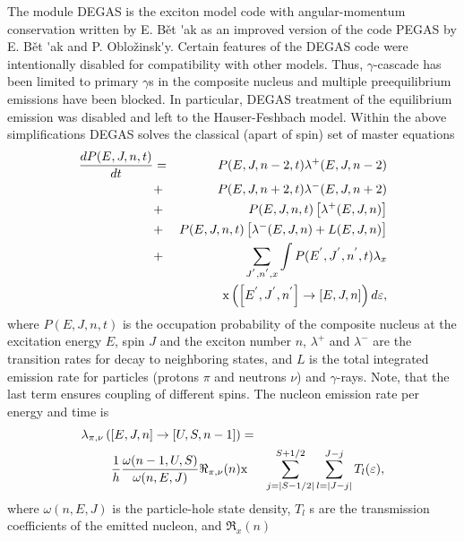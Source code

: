 The module DEGAS%
 is the exciton model code with angular-momentum conservation
written by E. B\v{e}t%
\'{ }ak as an improved version of the code PEGAS \cite{Degas} by E. B\v{e}t%
\'{ }ak and P. Oblo\v{z}insk\'{ }y. Certain features of the DEGAS code were
intentionally disabled for compatibility with other models.
Thus, $\gamma $-cascade has been limited to primary $\gamma $s in the
composite nucleus and multiple preequilibrium emissions have been blocked.
In particular, DEGAS treatment of the equilibrium emission was disabled and
left to the Hauser-Feshbach%
 model. %
Within the above simplifications DEGAS%
 solves the classical (apart of spin) set of master equations
\begin{eqnarray}
\frac{dP(E,J,n,t)}{dt} &=&P(E,J,n-2,t)\lambda ^{+}(E,J,n-2)  \notag \\
&+&P(E,J,n+2,t)\lambda ^{-}(E,J,n+2)  \notag \\
&+&P(E,J,n,t)\left[ \lambda ^{+}(E,J,n)\right]  \notag \\
&+&P(E,J,n,t)\left[ \lambda ^{-}(E,J,n)+L(E,J,n)\right]  \notag
\label{mastereq} \\
&+&\sum_{J^{^{\prime }},n^{^{\prime }},x}\int P(E^{^{\prime }},J^{^{\prime
}},n^{^{\prime }},t)\lambda _{x}  \notag \\
&&\text{x}\left( \left[ E^{^{\prime }},J^{^{\prime }},n^{^{\prime }}\right]
\rightarrow \left[ E,J,n\right] \right) d\varepsilon ,
\end{eqnarray}%
\noindent where $P(E,J,n,t)$ is the occupation probability of the composite
nucleus at the excitation energy $E$, spin $J$ and the exciton number $n$, $%
\lambda ^{+}$ and $\lambda ^{-}$ are the transition rates for decay to
neighboring states, and $L$ is the total integrated emission rate for
particles (protons $\pi $ and neutrons $\nu $) and $\gamma $-rays. Note,
that the last term ensures coupling of different spins. The nucleon emission
rate per energy and time is
\begin{eqnarray}
\lambda _{\pi ,\nu }\left( \left[ E,J,n\right] \rightarrow \left[ U,S,n-1%
\right] \right) &=& \\
\frac{1}{h}\frac{\omega (n-1,U,S)}{\omega (n,E,J)}\Re _{\pi ,\nu }(n) &\text{%
x}&\sum_{j=\mid S-1/2\mid }^{S+1/2}\sum_{l=\mid J-j\mid
}^{J-j}T_{l}(\varepsilon ),  \notag
\end{eqnarray}%
\noindent where $\omega (n,E,J)$ is the particle-hole state density, $T_{l}$%
s are the transmission coefficients of the emitted nucleon, and $\Re _{x}(n)$
